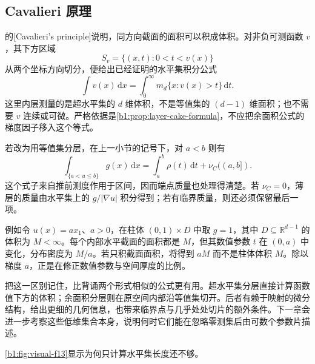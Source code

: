 \subsection{Cavalieri 原理}
\label{b1:subsec:180304}

的[Cavalieri's principle]说明，同方向截面的面积可以积成体积。对非负可测函数 \(v\)，其下方区域
\[
 S_v=\{(x,t):0<t<v(x)\}
\]
从两个坐标方向切分，便给出已经证明的水平集积分公式
\[
 \int v(x)\,\mathrm dx
 =\int_0^\infty m_d\{x:v(x)>t\}\,\mathrm dt.
\]
这里内层测量的是超水平集的 \(d\) 维体积，不是等值集的 \((d-1)\) 维面积；也不需要 \(v\) 连续或可微。严格依据是\cref{b1:prop:layer-cake-formula}，不应把余面积公式的梯度因子移入这个等式。

\ProseParagraphBreak

若改为用等值集分层，在上一小节的记号下，对 \(a<b\) 则有
\begin{equation}\label{b1:eq:slab-volume-coarea}
 \int_{\{a<u\leq b\}}g(x)\,\mathrm dx
 =\int_a^b\rho(t)\,\mathrm dt+\nu_C((a,b]).
\end{equation}
这个式子来自推前测度作用于区间，因而端点质量也处理得清楚。若 \(\nu_C=0\)，薄层的质量由水平集上的 \(g/|\nabla u|\) 积分得到；若有临界质量，则还必须保留最后一项。

\ProseParagraphBreak

例如令 \(u(x)=ax_1\)、\(a>0\)，在柱体 \((0,1)\times D\) 中取 \(g=1\)，其中 \(D\subseteq\mathbb R^{d-1}\) 的体积为 \(M<\infty\)。每个内部水平截面的面积都是 \(M\)，但其数值参数 \(t\) 在 \((0,a)\) 中变化，分布密度为 \(M/a\)。若只积截面面积，将得到 \(aM\) 而不是柱体体积 \(M\)。除以梯度 \(a\)，正是在修正数值参数与空间厚度的比例。

\ProseParagraphBreak

把这一区别记住，比背诵两个形式相似的公式更有用。超水平集分层直接计算函数值下方的体积；余面积分层则在原空间内部沿等值集切开。后者有赖于映射的微分结构，给出更细的几何信息，也带来临界点与几乎处处切片的额外条件。下一章会进一步考察这些低维集合本身，说明何时它们能在忽略零测集后由可数个参数片描述。

\cref{b1:fig:visual-f13}显示为何只计算水平集长度还不够。

